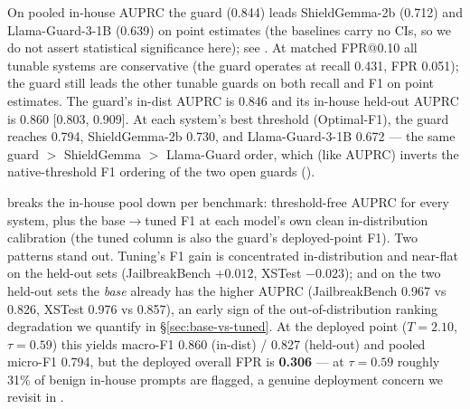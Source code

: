 \documentclass[sigconf,nonacm]{acmart}
\begin{document}
On pooled in-house AUPRC the guard (0.844) leads ShieldGemma-2b (0.712) and Llama-Guard-3-1B (0.639) on point estimates (the baselines carry no CIs, so we do not assert statistical significance here); see . At matched FPR@0.10 all tunable systems are conservative (the guard operates at recall 0.431, FPR 0.051); the guard still leads the other tunable guards on both recall and F1 on point estimates. The guard's in-dist AUPRC is 0.846 and its in-house held-out AUPRC is 0.860 [0.803, 0.909]. At each system's best threshold (Optimal-F1), the guard reaches 0.794, ShieldGemma-2b 0.730, and Llama-Guard-3-1B 0.672 --- the same guard $>$ ShieldGemma $>$ Llama-Guard order, which (like AUPRC) inverts the native-threshold F1 ordering of the two open guards ().

 breaks the in-house pool down per benchmark: threshold-free AUPRC for every system, plus the base$\to$tuned F1 at each model's own clean in-distribution calibration (the tuned column is also the guard's deployed-point F1). Two patterns stand out. Tuning's F1 gain is concentrated in-distribution and near-flat on the held-out sets (JailbreakBench $+0.012$, XSTest $-0.023$); and on the two held-out sets the \emph{base} already has the higher AUPRC (JailbreakBench 0.967 vs 0.826, XSTest 0.976 vs 0.857), an early sign of the out-of-distribution ranking degradation we quantify in \S\ref{sec:base-vs-tuned}. At the deployed point ($T=2.10$, $\tau=0.59$) this yields macro-F1 0.860 (in-dist) / 0.827 (held-out) and pooled micro-F1 0.794, but the deployed overall FPR is \textbf{0.306} --- at $\tau=0.59$ roughly 31\% of benign in-house prompts are flagged, a genuine deployment concern we revisit in .
\end{document}
